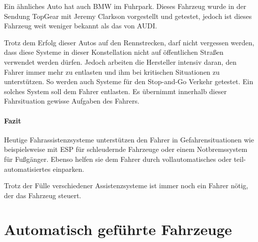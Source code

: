Ein ähnliches Auto hat auch BMW im Fuhrpark. Dieses Fahrzeug wurde in der Sendung TopGear mit Jeremy Clarkson vorgestellt und getestet, jedoch ist dieses Fahrzeug weit weniger bekannt als das von AUDI.

Trotz dem Erfolg dieser Autos auf den Rennstrecken, darf nicht vergessen werden, dass diese Systeme in dieser Konstellation nicht auf öffentlichen Straßen verwendet werden dürfen. Jedoch arbeiten die Hersteller intensiv daran, den Fahrer immer mehr zu entlasten und ihm bei kritischen Situationen zu unterstützen. So werden auch Systeme für den Stop-and-Go Verkehr getestet. Ein solches System soll dem Fahrer entlasten. Es übernimmt innerhalb dieser Fahrsituation gewisse Aufgaben des Fahrers.

\paragraph{Fazit} Heutige Fahrassistenzsysteme unterstützen den Fahrer in Gefahrensituationen wie beispielsweise mit ESP für schleudernde Fahrzeuge oder einem Notbremssystem für Fußgänger. Ebenso helfen sie dem Fahrer durch vollautomatisches oder teil-automatisiertes einparken. 

Trotz der Fülle verschiedener Assistenzsysteme ist  immer noch ein Fahrer nötig, der das Fahrzeug steuert. 




\section{Automatisch geführte Fahrzeuge}
